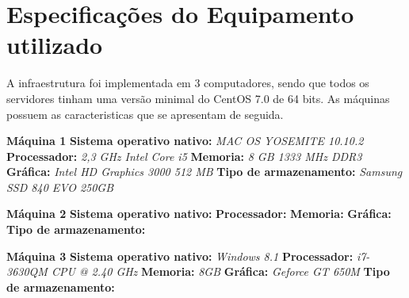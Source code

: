 \section{Especificações do Equipamento utilizado}

A infraestrutura foi implementada em 3 computadores, sendo que todos os servidores tinham uma versão minimal do CentOS 7.0 de 64 bits. As máquinas possuem as caracteristicas que se apresentam de seguida.

\textbf{Máquina 1}
\textbf{Sistema operativo nativo:} \textit{MAC OS YOSEMITE 10.10.2}
\textbf{Processador:} \textit{2,3 GHz Intel Core i5}
\textbf{Memoria:} \textit{8 GB 1333 MHz DDR3}
\textbf{Gráfica:} \textit{Intel HD Graphics 3000 512 MB}
\textbf{Tipo de armazenamento:} \textit{Samsung SSD 840 EVO 250GB}

\textbf{Máquina 2}
\textbf{Sistema operativo nativo:} \textit{}
\textbf{Processador:} \textit{}
\textbf{Memoria:} \textit{}
\textbf{Gráfica:} \textit{}
\textbf{Tipo de armazenamento:} \textit{}

\textbf{Máquina 3}
\textbf{Sistema operativo nativo:} \textit{Windows 8.1}
\textbf{Processador:} \textit{i7-3630QM CPU @ 2.40 GHz}
\textbf{Memoria:} \textit{8GB}
\textbf{Gráfica:} \textit{Geforce GT 650M}
\textbf{Tipo de armazenamento:} \textit{}
